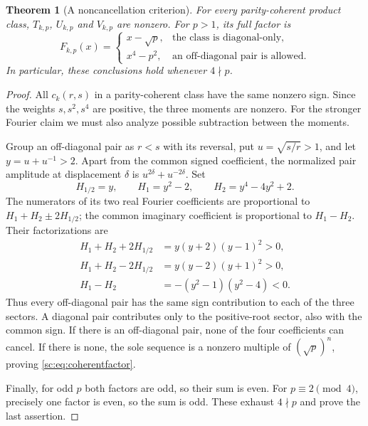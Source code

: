 \documentclass[11pt,a4paper]{article}
\numberwithin{equation}{section}
\newtheorem{theorem}{Theorem}[section]
\theoremstyle{definition}
\theoremstyle{remark}
\begin{document}
\begin{theorem}[A noncancellation criterion]\label{sc:thm:parity}
For every parity-coherent product class, $T_{k,p}$, $U_{k,p}$ and
$V_{k,p}$ are nonzero. For $p>1$, its full factor is
\begin{equation}\label{sc:eq:coherentfactor}
 F_{k,p}(x)=
 \begin{cases}
 x-\sqrt p,&\text{the class is diagonal-only},\\
 x^4-p^2,&\text{an off-diagonal pair is allowed}.
 \end{cases}
\end{equation}
In particular, these conclusions hold whenever $4\nmid p$.
\end{theorem}
\begin{proof}
All $c_k(r,s)$ in a parity-coherent class have the same nonzero sign.
Since the weights $s,s^2,s^4$ are positive, the three moments are nonzero.
For the stronger Fourier claim we must also analyze possible subtraction
between the moments.

Group an off-diagonal pair as $r<s$ with its reversal, put
$u=\sqrt{s/r}>1$, and let $y=u+u^{-1}>2$. Apart from the common signed
coefficient, the normalized pair amplitude at displacement $\delta$ is
$u^{2\delta}+u^{-2\delta}$. Set
\[
 H_{1/2}=y,\qquad H_1=y^2-2,\qquad H_2=y^4-4y^2+2.
\]
The numerators of its two real Fourier coefficients are proportional to
$H_1+H_2\pm2H_{1/2}$; the common imaginary coefficient is proportional
to $H_1-H_2$. Their factorizations are
\begin{align}
 H_1+H_2+2H_{1/2}&=y(y+2)(y-1)^2>0,\label{sc:eq:pluspositive}\\
 H_1+H_2-2H_{1/2}&=y(y-2)(y+1)^2>0,\label{sc:eq:minuspositive}\\
 H_1-H_2&=-(y^2-1)(y^2-4)<0.\label{sc:eq:imagnegative}
\end{align}
Thus every off-diagonal pair has the same sign contribution to each of
the three sectors. A diagonal pair contributes only to the positive-root
sector, also with the common sign. If there is an off-diagonal pair, none
of the four coefficients can cancel. If there is none, the sole sequence
is a nonzero multiple of $(\sqrt p)^n$, proving \eqref{sc:eq:coherentfactor}.

Finally, for odd $p$ both factors are odd, so their sum is even. For
$p\equiv2\pmod4$, precisely one factor is even, so the sum is odd.
These exhaust $4\nmid p$ and prove the last assertion.
\end{proof}
\end{document}
